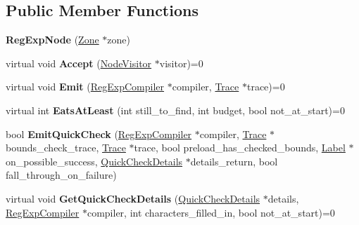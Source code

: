 \subsection*{Public Member Functions}
\begin{DoxyCompactItemize}
\item 
{\bfseries Reg\+Exp\+Node} (\hyperlink{classv8_1_1internal_1_1_zone}{Zone} $\ast$zone)\hypertarget{classv8_1_1internal_1_1_reg_exp_node_add9600e01845a3ef14f42ab18177ca3c}{}\label{classv8_1_1internal_1_1_reg_exp_node_add9600e01845a3ef14f42ab18177ca3c}

\item 
virtual void {\bfseries Accept} (\hyperlink{classv8_1_1internal_1_1_node_visitor}{Node\+Visitor} $\ast$visitor)=0\hypertarget{classv8_1_1internal_1_1_reg_exp_node_ac6b89282f32103ee66d71780f738350b}{}\label{classv8_1_1internal_1_1_reg_exp_node_ac6b89282f32103ee66d71780f738350b}

\item 
virtual void {\bfseries Emit} (\hyperlink{classv8_1_1internal_1_1_reg_exp_compiler}{Reg\+Exp\+Compiler} $\ast$compiler, \hyperlink{classv8_1_1internal_1_1_trace}{Trace} $\ast$trace)=0\hypertarget{classv8_1_1internal_1_1_reg_exp_node_ab9cd401dec1ad113895eab29871317c6}{}\label{classv8_1_1internal_1_1_reg_exp_node_ab9cd401dec1ad113895eab29871317c6}

\item 
virtual int {\bfseries Eats\+At\+Least} (int still\+\_\+to\+\_\+find, int budget, bool not\+\_\+at\+\_\+start)=0\hypertarget{classv8_1_1internal_1_1_reg_exp_node_aea14efd681709d8fd872361f05c4abf8}{}\label{classv8_1_1internal_1_1_reg_exp_node_aea14efd681709d8fd872361f05c4abf8}

\item 
bool {\bfseries Emit\+Quick\+Check} (\hyperlink{classv8_1_1internal_1_1_reg_exp_compiler}{Reg\+Exp\+Compiler} $\ast$compiler, \hyperlink{classv8_1_1internal_1_1_trace}{Trace} $\ast$bounds\+\_\+check\+\_\+trace, \hyperlink{classv8_1_1internal_1_1_trace}{Trace} $\ast$trace, bool preload\+\_\+has\+\_\+checked\+\_\+bounds, \hyperlink{classv8_1_1internal_1_1_label}{Label} $\ast$on\+\_\+possible\+\_\+success, \hyperlink{classv8_1_1internal_1_1_quick_check_details}{Quick\+Check\+Details} $\ast$details\+\_\+return, bool fall\+\_\+through\+\_\+on\+\_\+failure)\hypertarget{classv8_1_1internal_1_1_reg_exp_node_a9926645d60a5ce538c4c79f8e7151ca2}{}\label{classv8_1_1internal_1_1_reg_exp_node_a9926645d60a5ce538c4c79f8e7151ca2}

\item 
virtual void {\bfseries Get\+Quick\+Check\+Details} (\hyperlink{classv8_1_1internal_1_1_quick_check_details}{Quick\+Check\+Details} $\ast$details, \hyperlink{classv8_1_1internal_1_1_reg_exp_compiler}{Reg\+Exp\+Compiler} $\ast$compiler, int characters\+\_\+filled\+\_\+in, bool not\+\_\+at\+\_\+start)=0\hypertarget{classv8_1_1internal_1_1_reg_exp_node_add5e1fa780c60d5b3a910c00ed713ff6}{}\label{classv8_1_1internal_1_1_reg_exp_node_add5e1fa780c60d5b3a910c00ed713ff6}


\end{DoxyCompactItemize}
